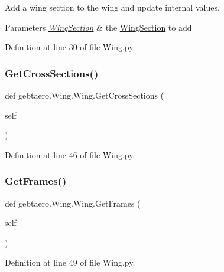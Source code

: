 Add a wing section to the wing and update internal values. 


\begin{DoxyParams}{Parameters}
{\em \hyperlink{namespacegebtaero_1_1_wing_section}{Wing\+Section}} & the \hyperlink{namespacegebtaero_1_1_wing_section}{Wing\+Section} to add \\
\hline
\end{DoxyParams}


Definition at line 30 of file Wing.\+py.

\mbox{\label{classgebtaero_1_1_wing_1_1_wing_a15245b467e6be2a7ace9a917e67661ff}} 
\subsubsection{\texorpdfstring{Get\+Cross\+Sections()}{GetCrossSections()}}
{\footnotesize\ttfamily def gebtaero.\+Wing.\+Wing.\+Get\+Cross\+Sections (\begin{DoxyParamCaption}\item[{}]{self }\end{DoxyParamCaption})}



Definition at line 46 of file Wing.\+py.

\mbox{\label{classgebtaero_1_1_wing_1_1_wing_a0bd0def91e16cd1a19b10fcdf8c50e41}} 
\subsubsection{\texorpdfstring{Get\+Frames()}{GetFrames()}}
{\footnotesize\ttfamily def gebtaero.\+Wing.\+Wing.\+Get\+Frames (\begin{DoxyParamCaption}\item[{}]{self }\end{DoxyParamCaption})}



Definition at line 49 of file Wing.\+py.

\mbox{\label{classgebtaero_1_1_wing_1_1_wing_afe768db8f9a06bd5784143c1168a5acc}} 
